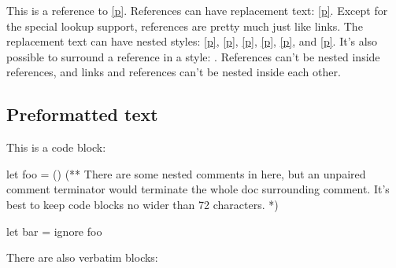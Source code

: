 This is a reference to \hyperref[container-page-test+u+package+++ml-module-Markup-val-foo]{[p\pageref*{container-page-test+u+package+++ml-module-Markup-val-foo}]}. References can have replacement text: \hyperref[container-page-test+u+package+++ml-module-Markup-val-foo]{[p\pageref*{container-page-test+u+package+++ml-module-Markup-val-foo}]}. Except for the special lookup support, references are pretty much just like links. The replacement text can have nested styles: \hyperref[container-page-test+u+package+++ml-module-Markup-val-foo]{[p\pageref*{container-page-test+u+package+++ml-module-Markup-val-foo}]}, \hyperref[container-page-test+u+package+++ml-module-Markup-val-foo]{[p\pageref*{container-page-test+u+package+++ml-module-Markup-val-foo}]}, \hyperref[container-page-test+u+package+++ml-module-Markup-val-foo]{[p\pageref*{container-page-test+u+package+++ml-module-Markup-val-foo}]}, \hyperref[container-page-test+u+package+++ml-module-Markup-val-foo]{[p\pageref*{container-page-test+u+package+++ml-module-Markup-val-foo}]}, \hyperref[container-page-test+u+package+++ml-module-Markup-val-foo]{[p\pageref*{container-page-test+u+package+++ml-module-Markup-val-foo}]}, and \hyperref[container-page-test+u+package+++ml-module-Markup-val-foo]{[p\pageref*{container-page-test+u+package+++ml-module-Markup-val-foo}]}. It's also possible to surround a reference in a style: . References can't be nested inside references, and links and references can't be nested inside each other.

\subsection{Preformatted text\label{preformatted-text}}%
This is a code block:\medbreak
\begin{ocamlcodeblock}
let foo = ()
(** There are some nested comments in here, but an unpaired comment
    terminator would terminate the whole doc surrounding comment. It's
    best to keep code blocks no wider than 72 characters. *)

let bar =
  ignore foo
\end{ocamlcodeblock}\medbreak
There are also verbatim blocks:

